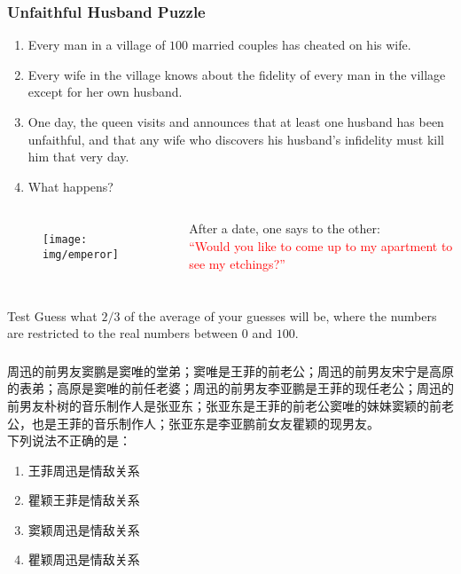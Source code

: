 \documentclass[UTF8,aspectratio=43,11pt,colorlinks,compress,openany]{beamer}%
\begin{document}
\begin{frame}\frametitle{Unfaithful Husband Puzzle}
	\begin{problem}
		\begin{enumerate}
			\item Every man in a village of $100$ married couples has cheated on his wife.
			\item Every wife in the village knows about the fidelity of every man in the village except for her own husband.
			\item One day, the queen visits and announces that at least one husband has been unfaithful, and that any wife who discovers his husband's infidelity must kill him that very day.
			\item What happens?
		\end{enumerate}
	\end{problem}\vspace{-2ex}
\begin{columns}
	\begin{figure}
	\texttt{[image: img/emperor]}
	\end{figure}
	After a date, one says to the other:\\
	\textcolor{red}{``Would you like to come up to my apartment to see my etchings?''}
\end{columns}
\end{frame}

\begin{frame}\frametitle{}
\begin{block}{Test}
Guess what $2/3$ of the average of your guesses will be, where the numbers are restricted to the real numbers between $0$ and $100$.
\end{block}
\end{frame}

\begin{frame}\frametitle{}
\begin{problem}
周迅的前男友窦鹏是窦唯的堂弟；窦唯是王菲的前老公；周迅的前男友宋宁是高原的表弟；高原是窦唯的前任老婆；周迅的前男友李亚鹏是王菲的现任老公；周迅的前男友朴树的音乐制作人是张亚东；张亚东是王菲的前老公窦唯的妹妹窦颖的前老公，也是王菲的音乐制作人；张亚东是李亚鹏前女友瞿颖的现男友。\\
下列说法不正确的是：
\begin{enumerate}
\item 王菲周迅是情敌关系
\item 瞿颖王菲是情敌关系
\item 窦颖周迅是情敌关系
\item 瞿颖周迅是情敌关系
\end{enumerate}
\end{problem}
\end{frame}
\end{document}
